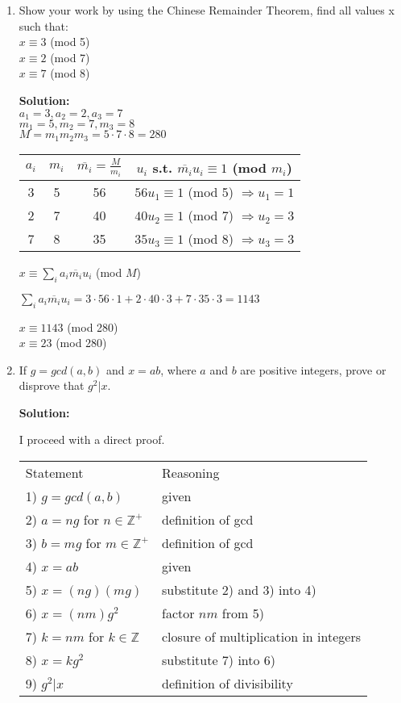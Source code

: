 \documentclass{article}
\newenvironment{solution}
{
\par
\color{blue}
\textbf{Solution:}
}
{
\par
}
\begin{document}
\begin{enumerate}
\item Show your work by using the Chinese Remainder Theorem, find all values x such that:\\
$x \equiv 3$ (mod 5) \\$x \equiv 2$ (mod 7)\\$x \equiv 7$ (mod 8)

\begin{solution}\\
$a_1 = 3, a_2 = 2, a_3 = 7$\\
$m_1 = 5, m_2 = 7, m_3 = 8$\\
$M = m_1 m_2 m_3 = 5 \cdot 7 \cdot 8 = 280$

\begin{center}
\begin{tabular}{c|c|c|c}
    $a_i$ & $m_i$ & $\overline{m_i} = \frac{M}{m_i}$ & $u_i$ s.t. $\overline{m_i} u_i \equiv 1$ (mod $m_i$)\\ \hline
    3 & 5 & 56 & $56 u_1 \equiv 1$ (mod 5) $\Rightarrow u_1 = 1$\\
    2 & 7 & 40 & $40 u_2 \equiv 1$ (mod 7) $\Rightarrow u_2 = 3$\\
    7 & 8 & 35 & $35 u_3 \equiv 1$ (mod 8) $\Rightarrow u_3 = 3$
\end{tabular}
\end{center}

$x \equiv \sum_i a_i \overline{m_i} u_i$ (mod $M$)

$\sum_i a_i \overline{m_i} u_i = 3 \cdot 56 \cdot 1 + 2 \cdot 40 \cdot 3 + 7 \cdot 35 \cdot 3 = 1143$

$x \equiv 1143$ (mod 280)\\
$x \equiv 23$ (mod 280)

\end{solution}

\item If $g = gcd(a, b)$ and $x = ab$, where $a$ and $b$ are positive integers, prove or disprove that $g^2 | x$.
\begin{solution}
I proceed with a direct proof.

\begin{center}
\begin{tabular}{l|l}
    Statement & Reasoning \\
    1) $g = gcd(a,b)$ & given\\ \hline
    2) $a = ng$ for $n \in \mathbb{Z}^+$ & definition of gcd\\
    3) $b = mg$ for $m \in \mathbb{Z}^+$ & definition of gcd\\
    4) $x = ab$ & given\\
    5) $x = (ng)(mg)$ & substitute 2) and 3) into 4)\\
    6) $x = (nm)g^2$ & factor $nm$ from 5)\\
    7) $k = nm$ for $k \in \mathbb{Z}$ & closure of multiplication in integers\\
    8) $x = kg^2$ & substitute 7) into 6)\\
    9) $g^2 | x$ & definition of divisibility
\end{tabular}
\end{center}


\end{solution}
\end{enumerate}
\end{document}
